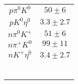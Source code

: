 \begin{table}[h]
{\begin{tabular}{|c|c|}
			$ p \pi^{0} K^{0} $ & $    50 \pm     6 $ \\
		$ p K^{0} \eta^{0} $ & $     3.3 \pm     2.7 $ \\
		$n \pi^{0} K^{+} $ & $    51 \pm     6 $ \\
		$ n \pi^{+} K^{0} $ & $    99 \pm    11 $ \\
		$n K^{+} \eta^{0} $ & $     3.4 \pm     2.7 $ \\
		&   \\
		&   \\
		&   \\
		&   \\
		&   \\	
		&   \\														
		\hline
	\end{tabular}}
\end{table}
